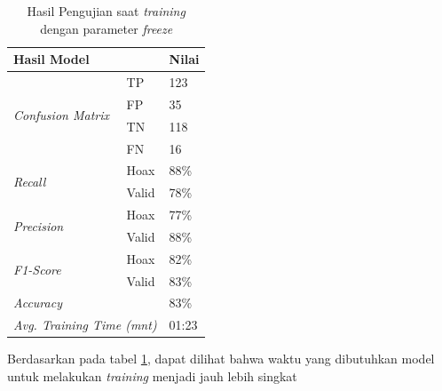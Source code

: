 \begin{table}[h]
    \caption{Hasil Pengujian saat \textit{training} dengan parameter \textit{freeze}}
    \label{tab: loss_freeze}
    \centering
    \begin{tabular}{|l|l|l|}
        \hline
        \multicolumn{2}{|l|}{\textbf{Hasil Model}}              & \textbf{Nilai}        \\ \hline
        \multirow{4}{*}{\textit{Confusion Matrix}}              & TP             & 123  \\ \cline{2-3}
                                                                & FP             & 35   \\ \cline{2-3}
                                                                & TN             & 118  \\ \cline{2-3}
                                                                & FN             & 16   \\ \hline
        \multirow{2}{*}{\textit{Recall}}                        & Hoax           & 88\% \\ \cline{2-3}
                                                                & Valid          & 78\% \\ \hline
        \multirow{2}{*}{\textit{Precision}}                     & Hoax           & 77\% \\ \cline{2-3}
                                                                & Valid          & 88\% \\ \hline
        \multirow{2}{*}{\textit{F1-Score}}                      & Hoax           & 82\% \\ \cline{2-3}
                                                                & Valid          & 83\% \\ \hline
        \multicolumn{2}{|l|}{\textit{Accuracy}}                 & 83\%                  \\ \hline
        \multicolumn{2}{|l|}{\textit{Avg. Training Time (mnt)}} & 01:23                 \\ \hline
    \end{tabular}
\end{table}

Berdasarkan pada tabel \ref{tab: loss_freeze}, dapat dilihat bahwa waktu yang dibutuhkan model untuk melakukan \textit{training} menjadi jauh lebih singkat

